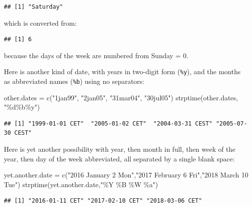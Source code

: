 \documentclass[
]{book}
\newenvironment{Shaded}{\begin{snugshade}}{\end{snugshade}}
\newcommand{\FunctionTok}[1]{\textcolor[rgb]{0.00,0.00,0.00}{#1}}
\newcommand{\NormalTok}[1]{#1}
\newcommand{\OtherTok}[1]{\textcolor[rgb]{0.56,0.35,0.01}{#1}}
\newcommand{\SpecialCharTok}[1]{\textcolor[rgb]{0.00,0.00,0.00}{#1}}
\newcommand{\StringTok}[1]{\textcolor[rgb]{0.31,0.60,0.02}{#1}}
\begin{document}
\begin{verbatim}
## [1] "Saturday"
\end{verbatim}

which is converted from:

\begin{Shaded}
\end{Shaded}

\begin{verbatim}
## [1] 6
\end{verbatim}

because the days of the week are numbered from Sunday = 0.

Here is another kind of date, with years in two-digit form (\texttt{\%y}), and the months as abbreviated names (\texttt{\%b}) using no separators:

\begin{Shaded}
\begin{Highlighting}[]
\NormalTok{other.dates }\OtherTok{=} \FunctionTok{c}\NormalTok{(}\StringTok{"1jan99"}\NormalTok{, }\StringTok{"2jan05"}\NormalTok{, }\StringTok{"31mar04"}\NormalTok{, }\StringTok{"30jul05"}\NormalTok{)}
\FunctionTok{strptime}\NormalTok{(other.dates, }\StringTok{"\%d\%b\%y"}\NormalTok{)}
\end{Highlighting}
\end{Shaded}

\begin{verbatim}
## [1] "1999-01-01 CET"  "2005-01-02 CET"  "2004-03-31 CEST" "2005-07-30 CEST"
\end{verbatim}

Here is yet another possibility with year, then month in full, then week of the year, then day of the week abbreviated, all separated by a single blank space:

\begin{Shaded}
\begin{Highlighting}[]
\NormalTok{yet.another.date }\OtherTok{=} \FunctionTok{c}\NormalTok{(}\StringTok{"2016 January 2 Mon"}\NormalTok{,}\StringTok{"2017 February 6 Fri"}\NormalTok{,}\StringTok{"2018 March 10 Tue"}\NormalTok{)}
\FunctionTok{strptime}\NormalTok{(yet.another.date,}\StringTok{"\%Y \%B \%W \%a"}\NormalTok{)}
\end{Highlighting}
\end{Shaded}

\begin{verbatim}
## [1] "2016-01-11 CET" "2017-02-10 CET" "2018-03-06 CET"
\end{verbatim}
\end{document}
